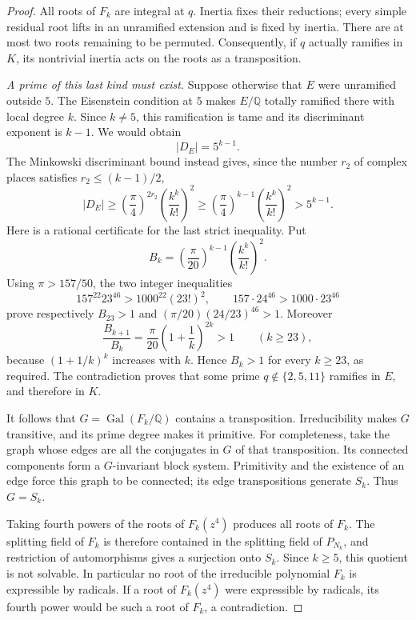 \documentclass[11pt,a4paper]{article}
\theoremstyle{definition}
\theoremstyle{remark}
\numberwithin{equation}{section}
\begin{document}
\begin{proof}
All roots of $F_k$ are integral at $q$. Inertia fixes their reductions;
every simple residual root lifts in an unramified extension and is fixed
by inertia. There are at most two roots remaining to be permuted.
Consequently, if $q$ actually ramifies in $K$, its nontrivial inertia
acts on the roots as a transposition.

\emph{A prime of this last kind must exist.}
Suppose otherwise that $E$ were unramified outside $5$. The Eisenstein
condition at $5$ makes $E/\mathbb Q$ totally ramified there with local
degree $k$. Since $k\ne5$, this ramification is tame and its discriminant
exponent is $k-1$. We would obtain
\[
 |D_E|=5^{k-1}.
\]
The Minkowski discriminant bound \cite[Corollary~14.20]{R097} instead gives, since the number $r_2$
of complex places satisfies $r_2\leq(k-1)/2$,
\[
 |D_E|\geq
 \left(\frac\pi4\right)^{2r_2}
 \left(\frac{k^k}{k!}\right)^2
 \geq
 \left(\frac\pi4\right)^{k-1}
 \left(\frac{k^k}{k!}\right)^2
 >5^{k-1}.
\]
Here is a rational certificate for the last strict inequality. Put
\[
 B_k=\left(\frac\pi{20}\right)^{k-1}
       \left(\frac{k^k}{k!}\right)^2.
\]
Using $\pi>157/50$, the two integer inequalities
\[
 157^{22}23^{46}>1000^{22}(23!)^2,
 \qquad
 157\cdot24^{46}>1000\cdot23^{46}
\]
prove respectively $B_{23}>1$ and
$(\pi/20)(24/23)^{46}>1$. Moreover
\[
 \frac{B_{k+1}}{B_k}
   =\frac\pi{20}\left(1+\frac1k\right)^{2k}>1
       \qquad(k\geq23),
\]
because $(1+1/k)^k$ increases with $k$. Hence $B_k>1$ for every
$k\geq23$, as required. The contradiction proves that some prime
$q\notin\{2,5,11\}$ ramifies in $E$, and therefore in $K$.

It follows that $G=\operatorname{Gal}(F_k/\mathbb Q)$ contains a
transposition. Irreducibility makes $G$ transitive, and its prime degree
makes it primitive. For completeness, take the graph whose edges are
all the conjugates in $G$ of that transposition. Its connected components
form a $G$-invariant block system. Primitivity and the existence of an
edge force this graph to be connected; its edge transpositions generate
$S_k$. Thus $G=S_k$.

Taking fourth powers of the roots of $F_k(z^4)$ produces all roots of
$F_k$. The splitting field of $F_k$ is therefore contained in the splitting field
of $P_{N_k}$, and restriction of automorphisms gives a surjection onto
$S_k$. Since $k\geq5$, this quotient is not solvable. In particular no
root of the irreducible polynomial $F_k$ is expressible by radicals.
If a root of $F_k(z^4)$ were expressible by radicals, its fourth power
would be such a root of $F_k$, a contradiction.
\end{proof}
\end{document}
